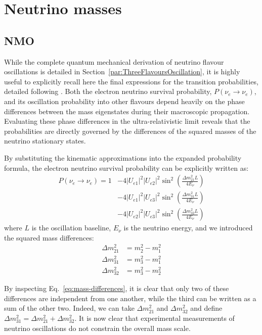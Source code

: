 \section{Neutrino masses}
\subsection{\ac{NMO}}
\label{subsec:NMO}
While the complete quantum mechanical derivation of neutrino flavour oscillations is detailed in Section~\ref{par:ThreeFlavoursOscillation}, it is highly useful to explicitly recall here the final expressions for the transition probabilities, detailed following \cite{Thomson}. Both the electron neutrino survival probability, $P(\nu_e \to \nu_e)$, and its oscillation probability into other flavours depend heavily on the phase differences between the mass eigenstates during their macroscopic propagation. Evaluating these phase differences in the ultra-relativistic limit reveals that the probabilities are directly governed by the differences of the squared masses of the neutrino stationary states. 

By substituting the kinematic approximations into the expanded probability formula, the electron neutrino survival probability can be explicitly written as:
\begin{equation}
    \label{eq:P_ee_main}
    \begin{aligned}
        P(\nu_e \to \nu_e) = 1 &- 4 |U_{e1}|^2|U_{e2}|^2 \sin^2\left(\frac{\Delta m^2_{21} L}{4E_\nu}\right) \\
        &- 4 |U_{e1}|^2|U_{e3}|^2 \sin^2\left(\frac{\Delta m^2_{31} L}{4E_\nu}\right) \\
        &- 4 |U_{e2}|^2|U_{e3}|^2 \sin^2\left(\frac{\Delta m^2_{32} L}{4E_\nu}\right)
    \end{aligned}
\end{equation}
where $L$ is the oscillation baseline, $E_\nu$ is the neutrino energy, and we introduced the squared mass differences:
\begin{equation}
    \label{eq:mass-differences}
    \begin{aligned}
        \Delta m^2_{21} &= m^2_2 - m^2_1 \\
        \Delta m^2_{31} &= m^2_3 - m^2_1 \\
        \Delta m^2_{32} &= m^2_3 - m^2_2 
    \end{aligned}
\end{equation}

By inspecting Eq.~\ref{eq:mass-differences}, it is clear that only two of these differences are independent from one another, while the third can be written as a sum of the other two. Indeed, we can take $\Delta m^2_{21}$ and $\Delta m^2_{32}$ and define $\Delta m^2_{31} = \Delta m^2_{21} + \Delta m^2_{32}$. It is now clear that experimental measurements of neutrino oscillations do not constrain the overall mass scale.

